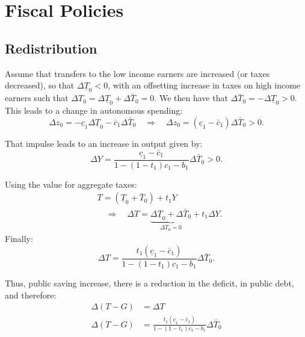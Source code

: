 \documentclass[]{book}
\begin{document}
\section{Fiscal Policies}\label{redistributive-fiscal}

\subsection{Redistribution}\label{redistribution-rich-to-poor}

Assume that transfers to the low income earners are increased (or taxes
decreased), so that \(\Delta\underline{T}_{0}<0\), with an offsetting
increase in taxes on high income earners such that
\(\Delta T_0 = \Delta\underline{T}_{0}+\Delta\bar{T}_{0}=0\). We then
have that \(\Delta\bar{T}_{0}=-\Delta\underline{T}_{0}>0\). This leads
to a change in autonomous spending:
\[\Delta z_{0}=-\underline{c}_{1}\Delta\underline{T}_{0}-\bar{c}_{1}\Delta\bar{T}_{0}\quad\Rightarrow\quad\Delta z_{0}=\left(\underline{c}_{1}-\bar{c}_{1}\right)\Delta\bar{T}_{0}>0.\]

That impulse leads to an increase in output given by:
\[\Delta Y=\frac{\underline{c}_{1}-\bar{c}_{1}}{1-\left(1-t_{1}\right)c_{1}-b_{1}}\Delta\bar{T}_{0}>0.\]

Using the value for aggregate taxes: \[
\begin{aligned}
&T=\left(\underline{T}_{0}+\bar{T}_{0}\right)+t_1 Y\\
&\quad \Rightarrow \quad \Delta T=\underbrace{\Delta\underline{T}_{0}+\Delta\bar{T}_{0}}_{\Delta T_0 = 0}+t_1\Delta Y.
\end{aligned}
\] Finally:
\[\Delta T=\frac{t_1\left(\underline{c}_{1}-\bar{c}_{1}\right)}{1-\left(1-t_{1}\right)c_{1}-b_{1}}\Delta\bar{T}_{0}.\]

Thus, public saving increase, there is a reduction in the deficit, in
public debt, and therefore: \[
\begin{aligned}
\Delta\left(T-G\right)&=\Delta T \\
\Delta\left(T-G\right)&=\frac{t_1\left(\underline{c}_{1}-\bar{c}_{1}\right)}{1-\left(1-t_{1}\right)c_{1}-b_{1}}\Delta\bar{T}_{0}
\end{aligned}
\]
\end{document}
